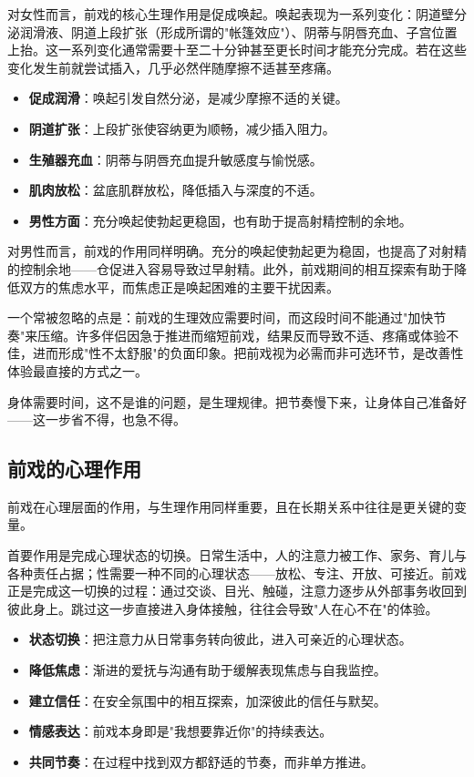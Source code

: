 \documentclass[12pt,UTF8]{ctexbook}
\newcommand{\keyword}[1]{\textbf{#1}}
\begin{document}
对女性而言，前戏的核心生理作用是促成唤起。唤起表现为一系列变化：阴道壁分泌润滑液、阴道上段扩张（形成所谓的"帐篷效应"）、阴蒂与阴唇充血、子宫位置上抬。这一系列变化通常需要十至二十分钟甚至更长时间才能充分完成。若在这些变化发生前就尝试插入，几乎必然伴随摩擦不适甚至疼痛。

\begin{itemize}
  \item \keyword{促成润滑}：唤起引发自然分泌，是减少摩擦不适的关键。
  \item \keyword{阴道扩张}：上段扩张使容纳更为顺畅，减少插入阻力。
  \item \keyword{生殖器充血}：阴蒂与阴唇充血提升敏感度与愉悦感。
  \item \keyword{肌肉放松}：盆底肌群放松，降低插入与深度的不适。
  \item \keyword{男性方面}：充分唤起使勃起更稳固，也有助于提高射精控制的余地。
\end{itemize}

对男性而言，前戏的作用同样明确。充分的唤起使勃起更为稳固，也提高了对射精的控制余地——仓促进入容易导致过早射精。此外，前戏期间的相互探索有助于降低双方的焦虑水平，而焦虑正是唤起困难的主要干扰因素。

一个常被忽略的点是：前戏的生理效应需要时间，而这段时间不能通过"加快节奏"来压缩。许多伴侣因急于推进而缩短前戏，结果反而导致不适、疼痛或体验不佳，进而形成"性不太舒服"的负面印象。把前戏视为必需而非可选环节，是改善性体验最直接的方式之一。

\begin{tcolorbox}[colback=pink!5!white,colframe=red!50!black,title=贴心小叮咛]
身体需要时间，这不是谁的问题，是生理规律。把节奏慢下来，让身体自己准备好——这一步省不得，也急不得。
\end{tcolorbox}
\subsection{前戏的心理作用}

前戏在心理层面的作用，与生理作用同样重要，且在长期关系中往往是更关键的变量。

首要作用是完成心理状态的切换。日常生活中，人的注意力被工作、家务、育儿与各种责任占据；性需要一种不同的心理状态——放松、专注、开放、可接近。前戏正是完成这一切换的过程：通过交谈、目光、触碰，注意力逐步从外部事务收回到彼此身上。跳过这一步直接进入身体接触，往往会导致"人在心不在"的体验。

\begin{itemize}
  \item \keyword{状态切换}：把注意力从日常事务转向彼此，进入可亲近的心理状态。
  \item \keyword{降低焦虑}：渐进的爱抚与沟通有助于缓解表现焦虑与自我监控。
  \item \keyword{建立信任}：在安全氛围中的相互探索，加深彼此的信任与默契。
  \item \keyword{情感表达}：前戏本身即是"我想要靠近你"的持续表达。
  \item \keyword{共同节奏}：在过程中找到双方都舒适的节奏，而非单方推进。
\end{itemize}
\end{document}
